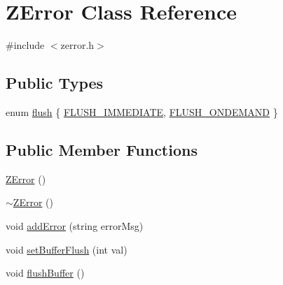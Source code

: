 \hypertarget{class_z_error}{\section{Z\-Error Class Reference}
\label{class_z_error}
}


{\ttfamily \#include $<$zerror.\-h$>$}

\subsection*{Public Types}
\begin{DoxyCompactItemize}
\item 
enum \hyperlink{class_z_error_a0b55bf98ee62a9614e249b5ef6d184f9}{flush} \{ \hyperlink{class_z_error_a0b55bf98ee62a9614e249b5ef6d184f9acc61b827431a7b09a95990c952ca1830}{F\-L\-U\-S\-H\-\_\-\-I\-M\-M\-E\-D\-I\-A\-T\-E}, 
\hyperlink{class_z_error_a0b55bf98ee62a9614e249b5ef6d184f9a0460ce1a3b526457ce5f08fac4572831}{F\-L\-U\-S\-H\-\_\-\-O\-N\-D\-E\-M\-A\-N\-D}
 \}
\end{DoxyCompactItemize}
\subsection*{Public Member Functions}
\begin{DoxyCompactItemize}
\item 
\hyperlink{class_z_error_a787f55d0c8b3c3777894249983aa83d4}{Z\-Error} ()
\item 
\hyperlink{class_z_error_a74830cdc570fb79a697566e16fadfd58}{$\sim$\-Z\-Error} ()
\item 
void \hyperlink{class_z_error_a46b084ba65b66073549c19f826d2f363}{add\-Error} (string error\-Msg)
\item 
void \hyperlink{class_z_error_a4c01e2544b6c981c63d0b354f5c21be1}{set\-Buffer\-Flush} (int val)
\item 
void \hyperlink{class_z_error_a607bcf825c9825e66e8ba91c75f79b04}{flush\-Buffer} ()
\end{DoxyCompactItemize}


